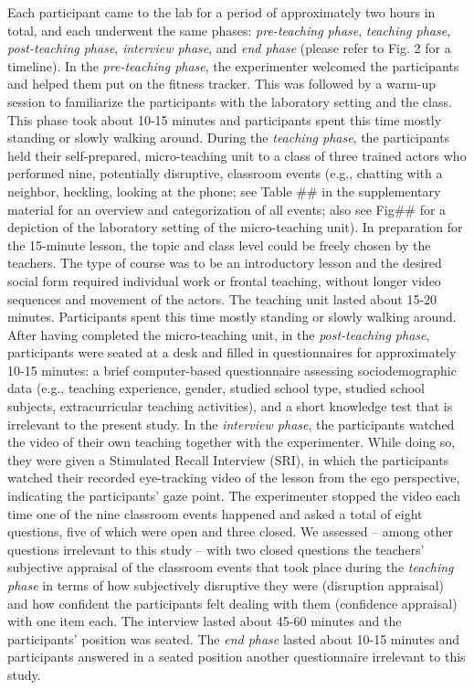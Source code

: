 \documentclass[]{elsarticle} %
\begin{document}
Each participant came to the lab for a period of approximately two hours
in total, and each underwent the same phases: \emph{pre-teaching phase},
\emph{teaching phase}, \emph{post-teaching phase}, \emph{interview
phase}, and \emph{end phase} (please refer to Fig. 2 for a timeline). In
the \emph{pre-teaching phase}, the experimenter welcomed the
participants and helped them put on the fitness tracker. This was
followed by a warm-up session to familiarize the participants with the
laboratory setting and the class. This phase took about 10-15 minutes
and participants spent this time mostly standing or slowly walking
around. During the \emph{teaching phase}, the participants held their
self-prepared, micro-teaching unit to a class of three trained actors
who performed nine, potentially disruptive, classroom events (e.g.,
chatting with a neighbor, heckling, looking at the phone; see Table \#\#
in the supplementary material for an overview and categorization of all
events; also see Fig\#\# for a depiction of the laboratory setting of
the micro-teaching unit). In preparation for the 15-minute lesson, the
topic and class level could be freely chosen by the teachers. The type
of course was to be an introductory lesson and the desired social form
required individual work or frontal teaching, without longer video
sequences and movement of the actors. The teaching unit lasted about
15-20 minutes. Participants spent this time mostly standing or slowly
walking around. After having completed the micro-teaching unit, in the
\emph{post-teaching phase}, participants were seated at a desk and
filled in questionnaires for approximately 10-15 minutes: a brief
computer-based questionnaire assessing sociodemographic data (e.g.,
teaching experience, gender, studied school type, studied school
subjects, extracurricular teaching activities), and a short knowledge
test that is irrelevant to the present study. In the \emph{interview
phase}, the participants watched the video of their own teaching
together with the experimenter. While doing so, they were given a
Stimulated Recall Interview (SRI), in which the participants watched
their recorded eye-tracking video of the lesson from the ego
perspective, indicating the participants' gaze point. The experimenter
stopped the video each time one of the nine classroom events happened
and asked a total of eight questions, five of which were open and three
closed. We assessed -- among other questions irrelevant to this study --
with two closed questions the teachers' subjective appraisal of the
classroom events that took place during the \emph{teaching phase} in
terms of how subjectively disruptive they were (disruption appraisal)
and how confident the participants felt dealing with them (confidence
appraisal) with one item each. The interview lasted about 45-60 minutes
and the participants' position was seated. The \emph{end phase} lasted
about 10-15 minutes and participants answered in a seated position
another questionnaire irrelevant to this study.
\end{document}
